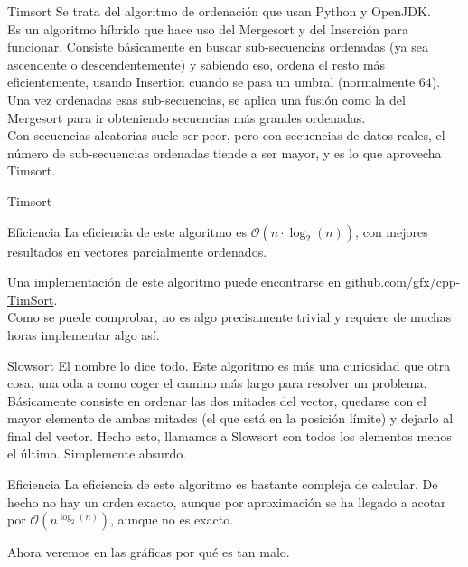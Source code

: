 \documentclass[compress]{beamer}
\begin{document}
\begin{frame}{Timsort}
Se trata del algoritmo de ordenación que usan Python y OpenJDK.\\
\vspace{0.20in}
Es un algoritmo híbrido que hace uso del Mergesort y del Inserción para funcionar. Consiste básicamente en buscar sub-secuencias ordenadas (ya sea ascendente o descendentemente) y sabiendo eso, ordena el resto más eficientemente, usando Insertion cuando se pasa un umbral (normalmente $64$). Una vez ordenadas esas sub-secuencias, se aplica una fusión como la del Mergesort para ir obteniendo secuencias más grandes ordenadas.\\
\vspace{0.20in}
Con secuencias aleatorias suele ser peor, pero con secuencias de datos reales, el número de sub-secuencias ordenadas tiende a ser mayor, y es lo que aprovecha Timsort.
\end{frame}

\begin{frame}{Timsort}
	\begin{block}{Eficiencia}
	La eficiencia de este algoritmo es $\mathcal{O}(n\cdot\log_2(n))$, con mejores resultados en vectores parcialmente ordenados.
	\end{block}
\vspace{0.20in}
Una implementación de este algoritmo puede encontrarse en \href{https://github.com/gfx/cpp-TimSort}{github.com/gfx/cpp-TimSort}.\\
\vspace{0.20in}
Como se puede comprobar, no es algo precisamente trivial y requiere de muchas horas implementar algo así.
\end{frame}

\begin{frame}{Slowsort}
El nombre lo dice todo. Este algoritmo es más una curiosidad que otra cosa, una oda a como coger el camino más largo para resolver un problema.\\
\vspace{0.20in}
Básicamente consiste en ordenar las dos mitades del vector, quedarse con el mayor elemento de ambas mitades (el que está en la posición límite) y dejarlo al final del vector. Hecho esto, llamamos a Slowsort con todos los elementos menos el último. Simplemente absurdo.\\
	\begin{block}{Eficiencia}
	La eficiencia de este algoritmo es bastante compleja de calcular. De hecho no hay un orden exacto, aunque por aproximación se ha llegado a acotar por $\mathcal{O}(n^{\log_2(n)})$, aunque no es exacto.
	\end{block}
Ahora veremos en las gráficas por qué es tan malo.
\end{frame}
\end{document}
